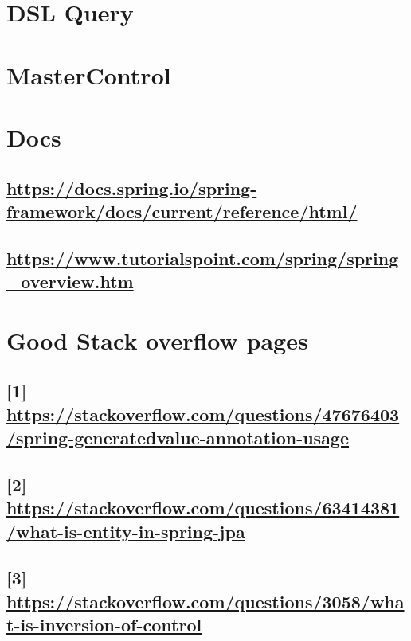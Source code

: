 \documentclass[11pt]{article}
\begin{document}
\section{DSL Query}
\label{sec:org61b8ddc}

\section{MasterControl}
\label{sec:orgd8917e8}

\section{Docs}
\label{sec:org8ccfc64}
\subsection{\url{https://docs.spring.io/spring-framework/docs/current/reference/html/}}
\label{sec:orgaacf834}
\subsection{\url{https://www.tutorialspoint.com/spring/spring\_overview.htm}}
\label{sec:orgb24deb7}
\section{Good Stack overflow pages}
\label{sec:orgc443446}
\subsection{[1] \url{https://stackoverflow.com/questions/47676403/spring-generatedvalue-annotation-usage}}
\label{sec:org40e491e}
\subsection{[2] \url{https://stackoverflow.com/questions/63414381/what-is-entity-in-spring-jpa}}
\label{sec:orgabafd5b}
\subsection{[3] \url{https://stackoverflow.com/questions/3058/what-is-inversion-of-control}}
\label{sec:org01a6bd6}
\end{document}
